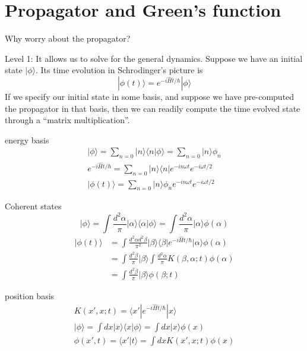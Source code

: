 \section{Propagator and Green's function}

Why worry about the propagator?

Level 1: It allows us to solve for the general dynamics. Suppose we have an initial state $|\phi\rangle$. Its time evolution in Schrodinger's picture is
\[ |\phi \left( t \right) \rangle =e^{-i\hat{H}t/\hbar}|\phi \rangle \]
If we specify our initial state in some basis, and suppose we have pre-computed the propagator in that basis, then we can readily compute the time evolved state through a ``matrix multiplication''.

energy basis
\begin{gather*}
    |\phi \rangle =\sum_{n=0}{|n\rangle \langle n|\phi \rangle}=\sum_{n=0}{|n\rangle \phi _n}\\
    e^{-i\hat{H}t/\hbar}=\sum_{n=0}{|n\rangle \langle n|e^{-in\omega t}e^{-i\omega t/2}}\\
    |\phi \left( t \right) \rangle =\sum_{n=0}{|n\rangle \phi _ne^{-in\omega t}e^{-i\omega t/2}}
\end{gather*}

Coherent states
\[ |\phi \rangle =\int{\frac{d^2\alpha}{\pi}|\alpha \rangle \langle \alpha |\phi \rangle}=\int{\frac{d^2\alpha}{\pi}|\alpha \rangle \phi \left( \alpha \right)}\]
\begin{align*}
    |\phi \left( t \right) \rangle &=\int{\frac{d^2\alpha d^2\beta}{\pi ^2}|\beta \rangle \langle \beta |e^{-i\hat{H}t/\hbar}|\alpha \rangle \phi \left( \alpha \right)}\\
    &=\int{\frac{d^2\beta}{\pi}|\beta \rangle \int{\frac{d^2\alpha}{\pi}K\left( \beta ,\alpha ;t \right) \phi \left( \alpha \right)}}\\
    &=\int{\frac{d^2\beta}{\pi}|\beta \rangle \phi \left( \beta ;t \right)}
\end{align*}

position basis
\begin{gather*}
    K\left( x',x;t \right) =\langle x'|e^{-i\hat{H}t/\hbar}|x\rangle \\
    |\phi \rangle =\int{dx|x\rangle \langle x|\phi \rangle}=\int{dx|x\rangle \phi \left( x \right)}\\
    \phi \left( x',t \right) =\langle x'|t\rangle =\int{dxK\left( x',x;t \right) \phi \left( x \right)}
\end{gather*}

